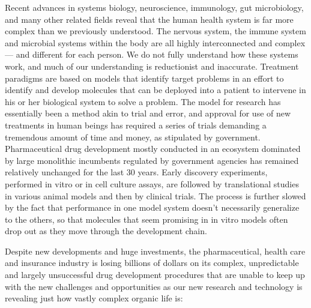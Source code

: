 Recent advances in systems biology, neuroscience, immunology, gut microbiology, and many other related fields reveal that the human health system is far more complex than we previously understood. The nervous system, the immune system and microbial systems within the body are all highly interconnected and complex --- and different for each person. We do not fully understand how these systems work, and much of our understanding is reductionist and inaccurate. Treatment paradigms are based on models that identify target problems in an effort to identify and develop molecules that can be deployed into a patient to intervene in his or her biological system to solve a problem. The model for research has essentially been a method akin to trial and error, and approval for use of new treatments in human beings has required a series of trials demanding a tremendous amount of time and money, as stipulated by government. Pharmaceutical drug development mostly conducted in an ecosystem dominated by large monolithic incumbents regulated by government agencies has remained relatively unchanged for the last 30 years. Early discovery experiments, performed in vitro or in cell culture assays, are followed by translational studies in various animal models and then by clinical trials. The process is further slowed by the fact that performance in one model system doesn't necessarily generalize to the others, so that molecules that seem promising in in vitro models often drop out as they move through the development chain.

Despite new developments and huge investments, the pharmaceutical, health care and insurance industry is losing billions of dollars on its complex, unpredictable and largely unsuccessful drug development procedures that are unable to keep up with the new challenges and opportunities as our new research and technology is revealing just how vastly complex organic life is:

